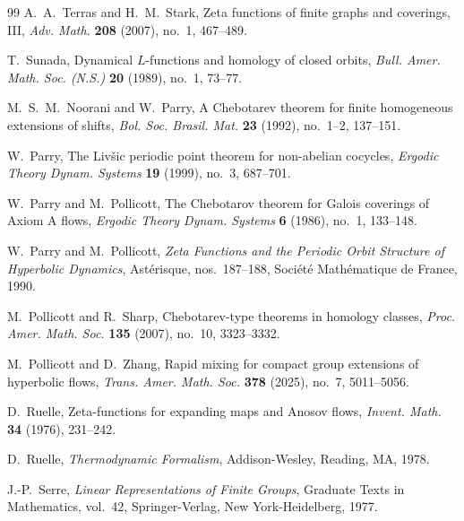 \documentclass[11pt,a4paper]{amsart}
\theoremstyle{plain}
\theoremstyle{definition}
\theoremstyle{remark}
\begin{document}
\begin{thebibliography}{99}
A.~A.~Terras and H.~M.~Stark,
Zeta functions of finite graphs and coverings, {III},
\textit{Adv. Math.} \textbf{208} (2007), no.~1, 467--489.

T.~Sunada,
Dynamical {$L$}-functions and homology of closed orbits,
\textit{Bull. Amer. Math. Soc. (N.S.)} \textbf{20} (1989), no.~1, 73--77.

M.~S.~M.~Noorani and W.~Parry,
A {C}hebotarev theorem for finite homogeneous extensions of shifts,
\textit{Bol. Soc. Brasil. Mat.} \textbf{23} (1992), no.~1--2, 137--151.

W.~Parry,
The {L}iv\v{s}ic periodic point theorem for non-abelian cocycles,
\textit{Ergodic Theory Dynam. Systems} \textbf{19} (1999), no.~3, 687--701.

W.~Parry and M.~Pollicott,
The {C}hebotarov theorem for {G}alois coverings of {A}xiom {A} flows,
\textit{Ergodic Theory Dynam. Systems} \textbf{6} (1986), no.~1, 133--148.

W.~Parry and M.~Pollicott,
\textit{Zeta Functions and the Periodic Orbit Structure of Hyperbolic Dynamics},
Ast\'erisque, nos.~187--188,
Soci\'et\'e Math\'ematique de France, 1990.

M.~Pollicott and R.~Sharp,
Chebotarev-type theorems in homology classes,
\textit{Proc. Amer. Math. Soc.} \textbf{135} (2007), no.~10, 3323--3332.

M.~Pollicott and D.~Zhang,
Rapid mixing for compact group extensions of hyperbolic flows,
\textit{Trans. Amer. Math. Soc.} \textbf{378} (2025), no.~7, 5011--5056.

D.~Ruelle,
Zeta-functions for expanding maps and {A}nosov flows,
\textit{Invent. Math.} \textbf{34} (1976), 231--242.

D.~Ruelle,
\textit{Thermodynamic Formalism},
Addison-Wesley, Reading, MA, 1978.

J.-P.~Serre,
\textit{Linear Representations of Finite Groups},
Graduate Texts in Mathematics, vol.~42,
Springer-Verlag, New York-Heidelberg, 1977.

\end{thebibliography}
\end{document}
